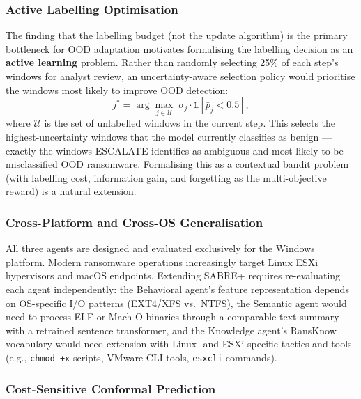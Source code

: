 \documentclass[journal]{IEEEtran}
\begin{document}
\subsubsection{Active Labelling Optimisation}

The finding that the labelling budget (not the update algorithm) is the primary bottleneck
for OOD adaptation motivates formalising the labelling decision as an \textbf{active
learning} problem.
Rather than randomly selecting 25\% of each step's windows for analyst review, an
uncertainty-aware selection policy would prioritise the windows most likely to improve
OOD detection:
\begin{equation}
j^{*} = \arg\max_{j \in \mathcal{U}} \;
    \sigma_j \cdot \mathbb{1}[\bar{p}_j < 0.5],
\label{eq:active_label}
\end{equation}
where $\mathcal{U}$ is the set of unlabelled windows in the current step.
This selects the highest-uncertainty windows that the model currently classifies as benign
--- exactly the windows ESCALATE identifies as ambiguous and most likely to be
misclassified OOD ransomware.
Formalising this as a contextual bandit problem (with labelling cost, information gain,
and forgetting as the multi-objective reward) is a natural extension.

\subsubsection{Cross-Platform and Cross-OS Generalisation}

All three agents are designed and evaluated exclusively for the Windows platform.
Modern ransomware operations increasingly target Linux ESXi hypervisors and macOS
endpoints.
Extending SABRE+ requires re-evaluating each agent independently: the Behavioral agent's
feature representation depends on OS-specific I/O patterns (EXT4/XFS vs.\ NTFS), the
Semantic agent would need to process ELF or Mach-O binaries through a comparable text
summary with a retrained sentence transformer, and the Knowledge agent's RansKnow
vocabulary would need extension with Linux- and ESXi-specific tactics and tools
(e.g., \texttt{chmod +x} scripts, VMware CLI tools, \texttt{esxcli} commands).

\subsubsection{Cost-Sensitive Conformal Prediction}
\end{document}
